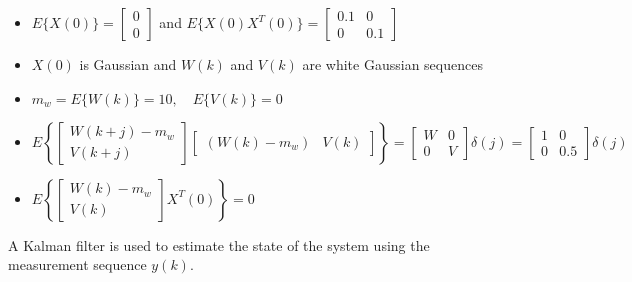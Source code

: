 \begin{itemize}
    \item
    $E \{ X(0) \} = \begin{bmatrix} 0 \\ 0 \end{bmatrix}$ and $E \{ X(0) X^T(0) \} = \begin{bmatrix} 0.1 & 0 \\ 0 & 0.1 \end{bmatrix}$

    \item
    $X(0)$ is Gaussian and $W(k)$ and $V(k)$ are white Gaussian sequences

    \item
    $m_{w} = E \{ W(k) \} = 10, \quad E \{ V(k) \} = 0$

    \item
    $E \left\{ \begin{bmatrix}
        W(k+j) - m_w  \\
        V(k+j)
    \end{bmatrix} \begin{bmatrix}
        (W(k) - m_w) &
        V(k)
    \end{bmatrix} \right\} = \begin{bmatrix}
        W & 0 \\
        0 & V
    \end{bmatrix} \delta(j) = \begin{bmatrix}
        1 & 0 \\
        0 & 0.5
    \end{bmatrix} \delta(j)$

    \item
    $E \left\{ \begin{bmatrix}
        W(k) - m_w  \\
        V(k)
    \end{bmatrix} X^T(0) \right\} = 0$

\end{itemize}
A Kalman filter is used to estimate the state of the system using the measurement sequence $y(k)$.

